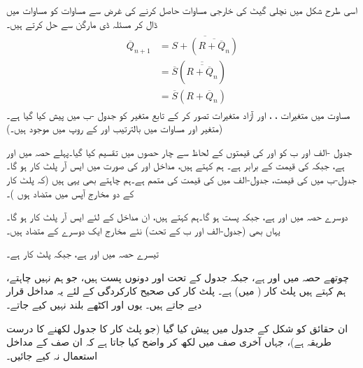اسی طرح شکل  میں نچلی گیٹ کی خارجی مساوات حاصل کرنے کی غرض سے مساوات  کو مساوات  میں ڈال کر مسئلہ ڈی مارگن سے حل کرتے ہیں۔
\begin{gather}
\begin{aligned}\label{مساوات_ترتیبی_ایس_آر_متمم}
\overline{Q}_{n+1}&=\overline{S+(\overline{R+\overline{Q}_n})}\\
&=\overline{S}(\overline{\overline{R+\overline{Q}_n}})\\
&=\overline{S}(R+\overline{Q}_n)
\end{aligned}
\end{gather}
مساوت  میں متغیرات ، ، اور  آزاد متغیرات تصور کر کے تابع متغیر  کو جدول  -ب میں پیش کیا گیا ہے۔(متغیر  اور  مساوات میں بالترتیب  اور  کے روپ میں موجود ہیں۔)



 جدول -الف اور ب کو  اور  کی قیمتوں کے لحاظ سے چار حصوں میں تقسیم کیا گیا۔پہلے حصہ میں  اور  ہے، جبکہ  کی قیمت  کے برابر ہے۔ ہم کہتے ہیں، مداخل  اور  کی صورت میں ایس آر پلٹ کار  ہو گا۔ جدول-ب
 میں  کی قیمت، جدول-الف میں کی قیمت کی متمم ہے۔ہم چاہتے بھی یہی ہیں (کہ پلٹ کار کے دو مخارج آپس میں متضاد ہوں )۔
 
دوسرے حصہ میں  اور  ہے، جبکہ  پست ہو گا۔ہم کہتے ہیں، ان مداخل کے لئے ایس آر پلٹ کار  ہو گا۔یہاں بھی (جدول-الف اور ب کے تحت) نئے مخارج ایک دوسرے کے متضاد ہیں۔

تیسرے حصہ میں  اور  ہے، جبکہ پلٹ کار  ہے۔

چوتھے حصہ میں  اور  ہے، جبکہ جدول کے تحت  اور  دونوں پست ہیں، جو ہم نہیں چاہتے، ہم کہتے ہیں پلٹ کار ( میں) ہے۔ پلٹ کار کی صحیح کارکردگی کے لئے یہ مداخل  قرار دیے جاتے ہیں۔ یوں  اور  اکٹھے بلند نہیں کیے جاتے۔

ان حقائق کو شکل  کے جدول میں پیش کیا گیا (جو پلٹ کار کا جدول لکھنے کا درست طریقہ ہے)، جہاں آخری صف میں  لکھ کر واضح کیا جاتا ہے کہ ان صف کے مداخل استعمال نہ کیے جائیں۔ 

